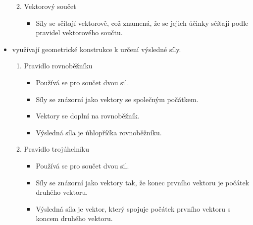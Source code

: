 \documentclass[letterpaper,10pt,english]{jupyterBook}
\begin{document}
\begin{itemize}
\begin{enumerate}
\begin{itemize}
\end{itemize}

\item {} 
\sphinxAtStartPar
Vektorový součet
\begin{itemize}
\item {} 
\sphinxAtStartPar
Síly se sčítají vektorově, což znamená, že se jejich účinky sčítají podle pravidel vektorového součtu.

\end{itemize}

\end{enumerate}

\item {} 
\sphinxAtStartPar
{} využívají geometrické konstrukce k určení výsledné síly.
\begin{enumerate}
%
\item {} 
\sphinxAtStartPar
Pravidlo rovnoběžníku
\begin{itemize}
\item {} 
\sphinxAtStartPar
Používá se pro součet dvou sil.

\item {} 
\sphinxAtStartPar
Síly se znázorní jako vektory se společným počátkem.

\item {} 
\sphinxAtStartPar
Vektory se doplní na rovnoběžník.

\item {} 
\sphinxAtStartPar
Výsledná síla je úhlopříčka rovnoběžníku.

\end{itemize}

\sphinxAtStartPar
{}

\item {} 
\sphinxAtStartPar
Pravidlo trojúhelníku
\begin{itemize}
\item {} 
\sphinxAtStartPar
Používá se pro součet dvou sil.

\item {} 
\sphinxAtStartPar
Síly se znázorní jako vektory tak, že konec prvního vektoru je počátek druhého vektoru.

\item {} 
\sphinxAtStartPar
Výsledná síla je vektor, který spojuje počátek prvního vektoru s koncem druhého vektoru.

\end{itemize}


\end{enumerate}
\end{itemize}
\end{document}
